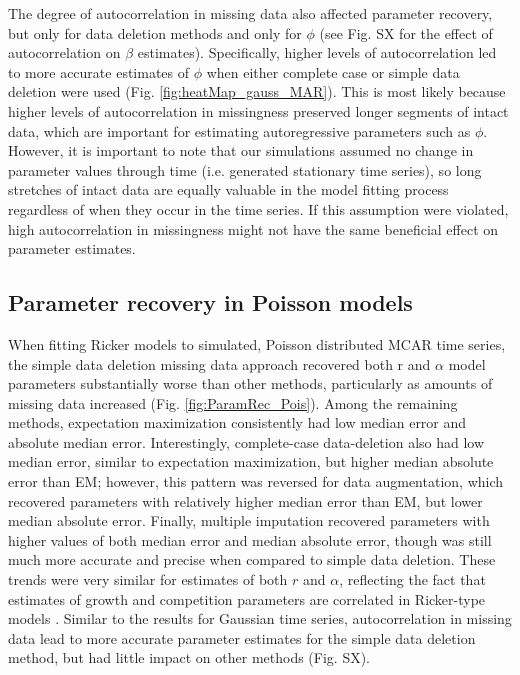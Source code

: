 \documentclass{article}
\begin{document}
The degree of autocorrelation in missing data also affected parameter recovery, but only for data deletion methods and only for $\phi$ (see Fig. SX for the effect of autocorrelation on $\beta$ estimates). Specifically, higher levels of autocorrelation led to more accurate estimates of $\phi$ when either complete case or simple data deletion were used (Fig. \ref{fig:heatMap_gauss_MAR}). This is most likely because higher levels of autocorrelation in missingness preserved longer segments of intact data, which are important for estimating autoregressive parameters such as $\phi$. However, it is important to note that our simulations assumed no change in parameter values through time (i.e. generated stationary time series), so long stretches of intact data are equally valuable in the model fitting process regardless of when they occur in the time series. If this assumption were violated, high autocorrelation in missingness might not have the same beneficial effect on parameter estimates.   

\subsection*{Parameter recovery in Poisson models}
When fitting Ricker models to simulated, Poisson distributed MCAR time series, the simple data deletion missing data approach recovered both r and $\alpha$ model parameters substantially worse than other methods, particularly as amounts of missing data increased (Fig. \ref{fig:ParamRec_Pois}). Among the remaining methods, expectation maximization consistently had low median error and absolute median error. Interestingly, complete-case data-deletion also had low median error, similar to expectation maximization, but higher median absolute error than EM; however, this pattern was reversed for data augmentation, which recovered parameters with relatively higher median error than EM, but lower median absolute error. Finally, multiple imputation recovered parameters with higher values of both median error and median absolute error, though was still much more accurate and precise when compared to simple data deletion. These trends were very similar for estimates of both $r$ and $\alpha$, reflecting the fact that estimates of growth and competition parameters are correlated in Ricker-type models \citep{bender1984perturbation}. Similar to the results for Gaussian time series, autocorrelation in missing data lead to more accurate parameter estimates for the simple data deletion method, but had little impact on other methods (Fig. SX).
\end{document}
